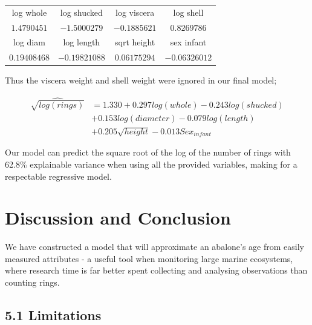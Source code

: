 \documentclass[letterpaper,9pt,twocolumn,twoside,]{pinp}
\begin{document}
\vspace{2mm}
\begin{tabular}{c c c c}
  log whole & log shucked & log viscera & log shell \\
  $1.4790451$ & $-1.5000279$ & $-0.1885621$ & $0.8269786$ \\
\hline
  log diam & log length & sqrt height & sex infant \\
  $0.19408468$ & $-0.19821088$ & $0.06175294$ & $-0.06326012$
\end{tabular}
\vspace{2mm}

Thus the viscera weight and shell weight were ignored in our final
model;

\begin{align*}
  \widehat{\sqrt{log(rings)}} &= 1.330 + 0.297 log(whole) -0.243 log(shucked)\\
  & + 0.153 log(diameter) -0.079 log(length)\\
  & + 0.205\sqrt{height}-0.013 Sex_{infant}
\end{align*}

Our model can predict the square root of the log of the number of rings
with 62.8\% explainable variance when using all the provided variables,
making for a respectable regressive model.

\hypertarget{discussion-and-conclusion}{%
\section{Discussion and Conclusion}\label{discussion-and-conclusion}}

We have constructed a model that will approximate an abalone's age from
easily measured attributes - a useful tool when monitoring large marine
ecosystems, where research time is far better spent collecting and
analysing observations than counting rings.

\hypertarget{limitations}{%
\subsection{5.1 Limitations}\label{limitations}}
\end{document}
